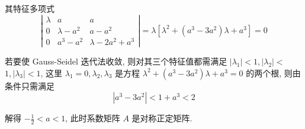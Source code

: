\begin{tcolorbox}[enhanced,colback=10,colframe=9,breakable,coltitle=green!25!black,title=2024]
其特征多项式
$$
\left|\begin{array}{ccc}
\lambda & a & a \\
0 & \lambda-a^{2} & a-a^{2} \\
0 & a^{3}-a^{2} & \lambda-2 a^{2}+a^{3}
\end{array}\right|=\lambda\left[\lambda^{2}+\left(a^{3}-3 a^{2}\right) \lambda+a^{3}\right]=0
$$

若要使 Gauss-Seidel 迭代法收敛, 则对其三个特征值都需满足 $ \left|\lambda_{1}\right|<1,\left|\lambda_{2}\right|< $ $ 1,\left|\lambda_{3}\right|<1 $, 这里 $ \lambda_{1}=0, \lambda_{2}, \lambda_{3} $ 是方程 $ \lambda^{2}+\left(a^{3}-3 a^{2}\right) \lambda+a^{3}=0 $ 的两个根, 则由
条件只需满足
$$
\left|a^{3}-3 a^{2}\right|<1+a^{3}<2
$$

解得 $ -\frac{1}{2}<a<1 $, 此时系数矩阵 $ A $ 是对称正定矩阵.
 \end{tcolorbox}


